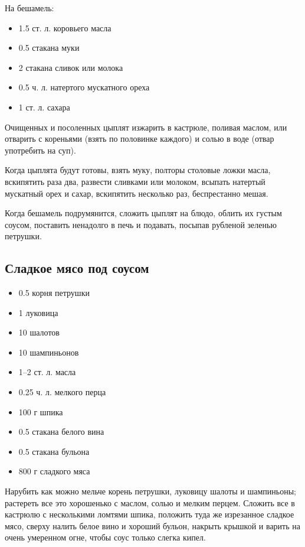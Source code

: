 На бешамель: 

\begin{itemize}
	\item 1.5 ст. л. коровьего масла
    \item 0.5 стакана муки 
    \item 2 стакана сливок или молока 
    \item 0.5 ч. л. натертого мускатного ореха 
    \item 1 ст. л. сахара
\end{itemize}

Очищенных и посоленных цыплят изжарить в кастрюле, поливая маслом, или отварить с кореньями (взять по половинке каждого) и солью в воде (отвар употребить на суп).

Когда цыплята будут готовы, взять муку, полторы столовые ложки масла, вскипятить раза два, развести сливками или молоком, всыпать натертый мускатный орех и сахар, вскипятить несколько раз, беспрестанно мешая.

Когда бешамель подрумянится, сложить цыплят на блюдо, облить их густым соусом, поставить ненадолго в печь и подавать, посыпав рубленой зеленью петрушки.

\subsection{Сладкое мясо под соусом}

\begin{itemize}
	\item 0.5 корня петрушки
    \item 1 луковица 
    \item 10 шалотов 
    \item 10 шампиньонов
    \item 1–2 ст. л. масла 
    \item 0.25 ч. л. мелкого перца
    \item 100 г шпика
    \item 0.5 стакана белого вина
    \item 0.5 стакана бульона 
    \item 800 г сладкого мяса
\end{itemize}

Нарубить как можно мельче корень петрушки, луковицу шалоты и шампиньоны; растереть все это хорошенько с маслом, солью и мелким перцем. Сложить все в кастрюлю с несколькими ломтями шпика, положить туда же изрезанное сладкое мясо, сверху налить белое вино и хороший бульон, накрыть крышкой и варить на очень умеренном огне, чтобы соус только слегка кипел.

